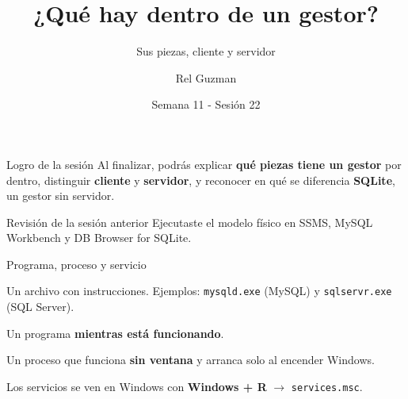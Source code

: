 \documentclass[aspectratio=169,10pt,c]{beamer}
\title{¿Qué hay dentro de un gestor?}
\subtitle{Sus piezas, cliente y servidor}
\date{Semana 11 - Sesión 22}
\author{Rel Guzman}
\begin{document}
{\maketitle}
\begin{frame}[c]
\begin{block}{Logro de la sesión}
Al finalizar, podrás explicar \textbf{qué piezas tiene un gestor} por dentro, distinguir \textbf{cliente} y \textbf{servidor}, y reconocer en qué se diferencia \textbf{SQLite}, un gestor sin servidor.
\end{block}
\end{frame}
\begin{frame}{Revisión de la sesión anterior}
\small Ejecutaste el modelo físico en SSMS, MySQL Workbench y DB Browser for SQLite.
\vspace{0.4cm}
\begin{center}
\end{center}
\vspace{0.4cm}
\end{frame}
\begin{frame}{Programa, proceso y servicio}
\begin{description}\setlength\itemsep{10pt}
  \item[Programa] Un archivo con instrucciones. Ejemplos: \texttt{mysqld.exe} (MySQL) y \texttt{sqlservr.exe} (SQL Server).
  \item[Proceso] Un programa \textbf{mientras está funcionando}.
  \item[Servicio] Un proceso que funciona \textbf{sin ventana} y arranca solo al encender Windows.
\end{description}
\vspace{0.3cm}
\small Los servicios se ven en Windows con \textbf{Windows + R} $\rightarrow$ \texttt{services.msc}.
\end{frame}
\end{document}
